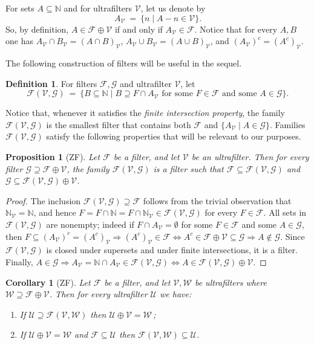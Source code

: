 \documentclass{amsart}
\newtheorem{proposition}[theorem]{Proposition}
\newtheorem{corollary}[theorem]{Corollary}
\theoremstyle{definition}
\newtheorem{definition}[theorem]{Definition}
\theoremstyle{remark}
\def\F{\mathscr{F}}
\def\G{\mathscr{G}}
\def\U{\mathscr{U}}
\def\V{\mathscr{V}}
\def\W{\mathscr{W}}
\def\N{\mathbb{N}}
\begin{document}
For sets $A\subseteq\N$ and for ultrafilters $\V$, let us denote by
$$A_\V\ =\ \{n\mid A-n\in\V\}.$$
So, by definition,  $A\in \F\oplus\V$ if and only if $A_\V\in\F$.
Notice that for every $A,B$ one has $A_\V\cap B_\V=(A\cap B)_\V$,
$A_\V\cup B_\V=(A\cup B)_\V$, and
$(A_\V)^c=(A^c)_\V$.

The following construction of filters will
be useful in the sequel.

\begin{definition}
For filters $\F,\G$ and ultrafilter $\V$, let
$$\F(\V,\G)\ =\ \{B\subseteq\N\mid B\supseteq F\cap A_\V\text{ for some }
F\in\F\text{ and some }A\in\G\}.$$
\end{definition}

Notice that, whenever it satisfies the \emph{finite intersection property},
the family $\F(\V,\G)$ is 
the smallest filter that contains both $\F$ and $\{A_\V\mid A\in\G\}$.
Families $\F(\V,\G)$ satisfy the following properties 
that will be relevant to our purposes.

\begin{proposition}[\textsf{ZF}]\label{fvg}
Let $\F$ be a filter, and let $\V$ be an ultrafilter.
Then for every filter $\G\supseteq\F\oplus\V$,
the family $\F(\V,\G)$ is a filter such that
$\F\subseteq\F(\V,\G)$ and $\G\subseteq\F(\V,\G)\oplus\V$. 
\end{proposition}

\begin{proof}
The inclusion $\F(\V,\G)\supseteq\F$ follows from the trivial
observation that $\N_\V=\N$, and hence 
$F=F\cap\N=F\cap\N_\V\in\F(\V,\G)$
for every $F\in\F$.
All sets in $\F(\V,\G)$ are nonempty; indeed 
if $F\cap A_\V=\emptyset$ for some $F\in\F$ and some $A\in\G$,
then $F\subseteq(A_\V)^c=(A^c)_\V\Rightarrow (A^c)_\V\in\F
\Leftrightarrow A^c\in\F\oplus\V\subseteq\G\Rightarrow A\notin\G$.
Since $\F(\V,\G)$ is closed under supersets
and under finite intersections, it is a filter. Finally, 
$A\in\G\Rightarrow A_\V=\N\cap A_\V\in\F(\V,\G)\Leftrightarrow 
A\in\F(\V,\G)\oplus\V$.
\end{proof}

\begin{corollary}[\textsf{ZF}]\label{cor1}
Let $\F$ be a filter, and let $\V,\W$ be ultrafilters
where $\W\supseteq\F\oplus\V$.
Then for every ultrafilter $\U$ we have:
\begin{enumerate}
\item
If $\U\supseteq\F(\V,\W)$ then $\U\oplus\V=\W$\,;
\item
If $\U\oplus\V=\W$ and $\F\subseteq\U$ then 
$\F(\V,\W)\subseteq\U$.
\end{enumerate}
\end{corollary}
\end{document}
